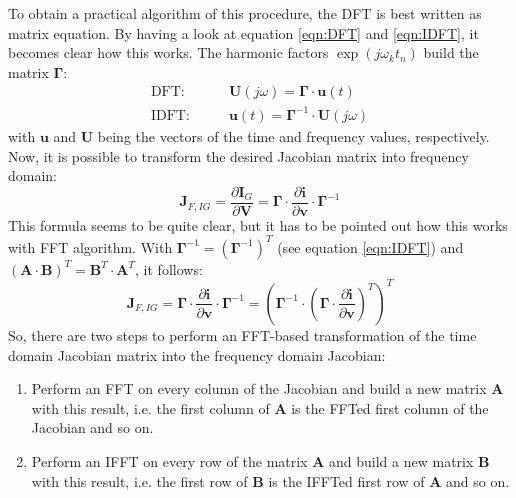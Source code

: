 \addvspace{12pt}

To obtain a practical algorithm of this procedure, the DFT is best written
as matrix equation. By having a look at equation \ref{eqn:DFT} and
\ref{eqn:IDFT}, it becomes clear how this works. The harmonic factors
$\exp(j\omega_k t_n)$ build the matrix $\boldsymbol{\Gamma}$:
\begin{align}
\text{DFT:}  \qquad & \boldsymbol{U}(j\omega) = \boldsymbol{\Gamma}\cdot \boldsymbol{u}(t) \\
\text{IDFT:} \qquad & \boldsymbol{u}(t) = \boldsymbol{\Gamma}^{-1}\cdot \boldsymbol{U}(j\omega)
\end{align}
with $\boldsymbol{u}$ and $\boldsymbol{U}$ being the vectors of the time
and frequency values, respectively. Now, it is possible to transform the
desired Jacobian matrix into frequency domain:
\begin{equation}
\boldsymbol{J}_{F,IG} = \frac{\partial\boldsymbol{I}_G}{\partial\boldsymbol{V}}
  = \boldsymbol{\Gamma}\cdot\frac{\partial\boldsymbol{i}}{\partial\boldsymbol{v}}
    \cdot\boldsymbol{\Gamma}^{-1}
\end{equation}
This formula seems to be quite clear, but it has to be pointed out how
this works with FFT algorithm. With
$\boldsymbol{\Gamma}^{-1} = (\boldsymbol{\Gamma}^{-1})^T$
(see equation \ref{eqn:IDFT}) and
$(\boldsymbol{A}\cdot\boldsymbol{B})^T = \boldsymbol{B}^T\cdot \boldsymbol{A}^T$,
it follows:
\begin{equation}
\boldsymbol{J}_{F,IG}
  = \boldsymbol{\Gamma}\cdot\frac{\partial\boldsymbol{i}}{\partial\boldsymbol{v}}
    \cdot\boldsymbol{\Gamma}^{-1}
  = \left( \boldsymbol{\Gamma}^{-1}\cdot \left( \boldsymbol{\Gamma} \cdot
    \frac{\partial\boldsymbol{i}}{\partial\boldsymbol{v}} \right)^T \right)^T
\end{equation}
So, there are two steps to perform an FFT-based transformation of the time
domain Jacobian matrix into the frequency domain Jacobian:
\begin{enumerate}
\item Perform an FFT on every column of the Jacobian and build a new matrix
      $\boldsymbol{A}$ with this result, i.e. the first column of
      $\boldsymbol{A}$ is the FFTed first column of the Jacobian and so on.
\item Perform an IFFT on every row of the matrix $\boldsymbol{A}$ and build
      a new matrix $\boldsymbol{B}$ with this result, i.e. the first row of
      $\boldsymbol{B}$ is the IFFTed first row of $\boldsymbol{A}$ and so on.
\end{enumerate}


